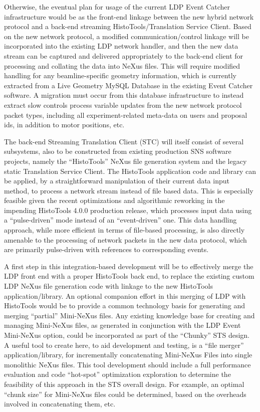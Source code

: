 Otherwise, the eventual plan for usage
of the current LDP Event Catcher infrastructure
would be as the front-end linkage between the new hybrid network protocol
and a back-end streaming HistoTools/Translation Service Client.
Based on the new network protocol,
a modified communication/control linkage will be incorporated
into the existing LDP network handler,
and then the new data stream can be captured and delivered appropriately
to the back-end client for processing
and collating the data into NeXus files.
This will require modified handling
for any beamline-specific geometry information,
which is currently extracted from a Live Geometry MySQL Database
in the existing Event Catcher software.
A migration must occur from this database infrastructure
to instead extract slow controls process variable updates
from the new network protocol packet types,
including all experiment-related meta-data on
users and proposal ids, in addition to motor positions, etc.

The back-end Streaming Translation Client (STC)
will itself consist of several subsystems,
also to be constructed from existing production SNS software projects,
namely the ``HistoTools'' NeXus file generation system
and the legacy static Translation Service Client.
The HistoTools application code and library can be applied,
by a straightforward manipulation of their current data input method,
to process a network stream instead of file based data.
This is especially feasible given the recent optimizations and
algorithmic reworking in the impending HistoTools 4.0.0 production release,
which processes input data using a ``pulse-driven'' mode
instead of an ``event-driven'' one.
This data handling approach,
while more efficient in terms of file-based processing,
is also directly amenable
to the processing of network packets in the new data protocol,
which are primarily pulse-driven with references to corresponding events.

A first step in this integration-based development
will be to effectively merge the LDP front end
with a proper HistoTools back end,
to replace the existing custom LDP NeXus file generation code
with linkage to the new HistoTools application/library.
An optional companion effort in this merging of LDP with HistoTools
would be to provide a common technology basis for
generating and merging ``partial'' Mini-NeXus files.
Any existing knowledge base for creating and managing Mini-NeXus files,
as generated in conjunction with the LDP Event Mini-NeXus option,
could be incorporated as part of the ``Chunky'' STS design.
A useful tool to create here, to aid development and testing,
is a ``file merger'' application/library,
for incrementally concatenating Mini-NeXus Files into
single monolithic NeXus files.
This tool development should include a full performance evaluation
and code ``hot-spot'' optimization exploration
to determine the feasibility of this approach in the STS overall design.
For example, an optimal ``chunk size'' for Mini-NeXus files
could be determined,
based on the overheads involved in concatenating them, etc.

